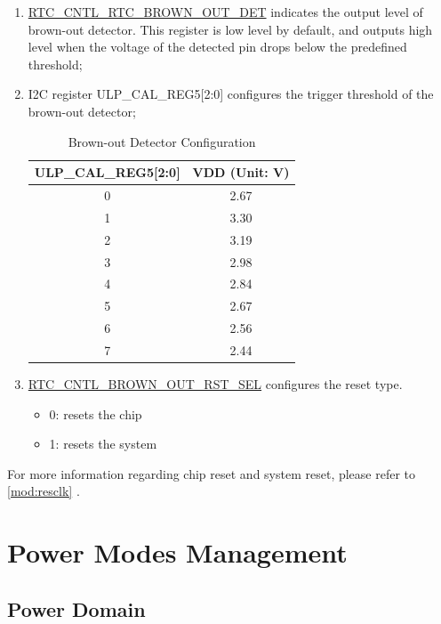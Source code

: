 \documentclass[main\_\_EN.tex]{subfiles}
\begin{document}
\begin{enumerate}
    \item \hyperref[fielddesc:RTCCNTLRTCBROWNOUTDET]{RTC\_CNTL\_RTC\_BROWN\_OUT\_DET} indicates the output level of brown-out detector. This register is low level by default, and outputs high level when the voltage of the detected pin drops below the predefined threshold;
    \item I2C register ULP\_CAL\_REG5[2:0] configures the trigger threshold of the brown-out detector;
\begin{table}[H]
\caption{Brown-out Detector Configuration}\label{table:brownout-voltage}
\centering
\begin{tabular}{|c|c|}
\hline
\rowcolor[HTML]{C0C0C0}
ULP\_CAL\_REG5{[}2:0{]} & VDD (Unit: V) \\ \hline
0 & 2.67 \\ \hline
1 & 3.30 \\ \hline
2 & 3.19 \\ \hline
3 & 2.98 \\ \hline
4 & 2.84 \\ \hline
5 & 2.67 \\ \hline
6 & 2.56 \\ \hline
7 & 2.44 \\ \hline
\end{tabular}
\end{table}
    \item \hyperref[fielddesc:RTCCNTLBROWNOUTRSTSEL]{RTC\_CNTL\_BROWN\_OUT\_RST\_SEL} configures the reset type.
    \begin{itemize}
        \item 0: resets the chip
        \item 1: resets the system
    \end{itemize}
\end{enumerate}

\begin{tiplisting}
For more information regarding chip reset and system reset, please refer to \ref{mod:resclk} \textit{}.
\end{tiplisting}

\section{Power Modes Management}

\subsection{Power Domain}\label{powerdomain}
\end{document}
